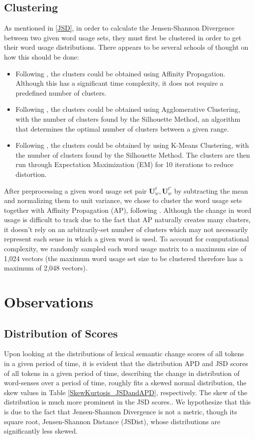 \documentclass[10pt, a4paper]{article}
\begin{document}
\subsection{Clustering}
\label{clustering}
As mentioned in \ref{JSD}, in order to calculate the Jensen-Shannon Divergence between two given word usage sets, they must first be clustered in order to get their word usage distributions. There appears to be several schools of thought on how this should be done:
\begin{itemize}
    \item{Following , the clusters could be obtained using Affinity Propagation. Although this has a significant time complexity, it does not require a predefined number of clusters.}
    \item{Following , the clusters could be obtained using Agglomerative Clustering, with the number of clusters found by the Silhouette Method\cite{silhouette}, an algorithm that determines the optimal number of clusters between a given range.}
    \item{Following , the clusters could be obtained by using K-Means Clustering, with the number of clusters found by the Silhouette Method. The clusters are then run through Expectation Maximization (EM) for 10 iterations to reduce distortion.}
\end{itemize}

After preprocessing a given word usage set pair $\textbf{U}^{t}_w, \textbf{U}^{t'}_w$ by subtracting the mean and normalizing them to unit variance, we chose to cluster the word usage sets together with Affinity Propagation (AP), following \cite{Martinc2020,Kutuzov2020}. Although the change in word usage is difficult to track due to the fact that AP naturally creates many clusters, it doesn't rely on an arbitrarily-set number of clusters which may not necessarily represent each sense in which a given word is used. To account for computational complexity, we randomly sampled each word usage matrix to a maximum size of 1,024 vectors (the maximum word usage set size to be clustered therefore has a maximum of 2,048 vectors).

\section{Observations}
\subsection{Distribution of Scores}
Upon looking at the distributions of lexical semantic change scores of all tokens in a given period of time, it is evident that the distribution APD and JSD scores of all tokens in a given period of time, describing the change in distribution of word-senses over a period of time, roughly fits a skewed normal distribution, the skew values in Table \ref{SkewKurtosis_JSDandAPD}, respectively. The skew of the distribution is much more prominent in the JSD scores.. We hypothesize that this is due to the fact that Jensen-Shannon Divergence is not a metric, though its square root, Jensen-Shannon Distance (JSDist), whose distributions are significantly less skewed.
\end{document}
